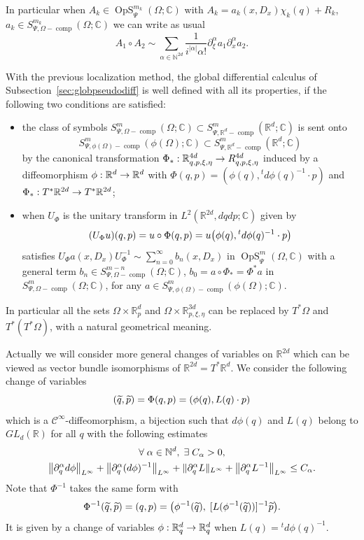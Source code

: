 \documentclass[AHL,Unicode,longabstracts]{cedram}
\newcommand{\C}{\mathbb{C}}
\newcommand{\R}{\mathbb{R}}
\newcommand{\N}{\mathbb{N}}
\newcommand{\clC}{\mathcal{C}}
\DeclareMathOperator{\OpS}{OpS}
\DeclareMathOperator{\ccomp}{comp}
\let\oldtilde\tilde
\renewcommand*{\tilde}[1]{\mathchoice{\widetilde{#1}}{\widetilde{#1}}{\oldtilde{#1}}{\oldtilde{#1}}}
\let\oldexists\exists
\renewcommand*{\exists}{\mathrel{\oldexists}}
\let\oldforall\forall
\renewcommand*{\forall}{\mathrel{\oldforall}}
\let\originalleft\left
\let\originalright\right
\renewcommand{\left}{\mathopen{}\mathclose\bgroup\originalleft}
\renewcommand{\right}{\aftergroup\egroup\originalright}
\renewcommand*{\to}{\mathchoice{\longrightarrow}{\rightarrow}{\rightarrow}{\rightarrow}}
\begin{document}
In particular when $A_{k}\in \OpS^{m_{k}}_{\Psi}(\Omega;\C)$ with $A_{k}=a_{k}(x,D_{x})\chi_{k}(q)+R_{k}$, $a_{k}\in S^{m_{k}}_{\Psi,\Omega-\ccomp}(\Omega;\C)$ we can write as usual
\[
A_{1}\circ A_{2}\sim \sum_{\alpha \in \N^{2d}}\frac{1}{i^{|\alpha|}\alpha!}\partial_{\xi}^{\alpha}a_{1}\partial_{x}^{\alpha}a_{2}.
\]

With the previous localization method, the global differential calculus of Subsection~\ref{sec:globpseudodiff} is well defined with all its properties, if the following two conditions are satisfied:
\begin{itemize}
\item the class of symbols $S^{m}_{\Psi,\Omega-\ccomp}(\Omega;\C)\subset S^{m}_{\Psi,\R^{d}-\ccomp}(\R^{d};\C)$ is sent onto 
\[
S^{m}_{\Psi,\phi(\Omega)-\ccomp}(\phi(\Omega);\C) \subset S^m_{\Psi,\R^d-\ccomp}(\R^d;\C)
\]
by the canonical transformation $\Phi_{*}: \R^{4d}_{q,p,\xi,\eta}\to R^{4d}_{q,p,\xi,\eta}$ induced by a diffeomorphism $\phi:\R^{d}\to \R^{d}$ with $\Phi(q,p)=(\phi(q),{}^{t}d\phi(q)^{-1}\cdot p)$ and $\Phi_{*}:T^{*}\R^{2d}\to T^{*}\R^{2d}$;
\item when $U_{\Phi}$ is the unitary transform in $L^{2}(\R^{2d},dqdp;\C)$ given by
\[
(U_{\Phi}u)(q,p)=u\circ{\Phi(q,p)}=u\left(\phi(q),{}^{t}d\phi(q)^{-1}\cdot p\right)
\]
satisfies $U_{\Phi}a(x,D_{x})U_{\Phi}^{-1}\sim \sum_{n=0}^{\infty}b_{n}(x,D_{x})$ in $\OpS^{m}_{\Psi}(\Omega,\C)$ with a general term $b_{n}\in S^{m-n}_{\Psi, \Omega-\ccomp}(\Omega;\C)$, $b_{0}=a\circ \Phi_{*}=\Phi^{*}a$ in $S^{m}_{\Psi,\Omega-\ccomp}(\Omega;\C)$, for any $a\in S^{m}_{\Psi,\phi(\Omega)-\ccomp}(\phi(\Omega);\C)$.
\end{itemize}
In particular all the sets $\Omega\times\R^{d}_{p}$ and $\Omega\times \R^{3d}_{p,\xi,\eta}$ can be replaced by $T^{*}\Omega$ and $T^{*}(T^{*}\Omega)$, with a natural geometrical meaning.

Actually we will consider more general changes of variables on $\R^{2d}$ which can be viewed as vector bundle isomorphisms of $\R^{2d}=T^{*}\R^{d}$. We consider the following change of variables
\begin{equation}\label{eq:defPhi}
(\tilde{q},\tilde{p})=\Phi(q,p)=(\phi(q), L(q)\cdot p)
\end{equation}
which is a $\clC^{\infty}$-diffeomorphism, a bijection such that $d\phi(q)$ and $L(q)$ belong to $GL_{d}(\R)$ for all $q$ with the following estimates
\begin{equation}\label{eq:estimPhi}
\begin{gathered}
\forall \alpha\in \N^{d},\;\exists C_{\alpha}>0,\\
\left\|\partial_{q}^{\alpha}d\phi\right\|_{L^{\infty}}+\left\|\partial_{q}^{\alpha}(d\phi)^{-1}\right\|_{L^{\infty}}+\|\partial_{q}^{\alpha}L\|_{L^{\infty}}+\left\|\partial_{q}^{\alpha}L^{-1}\right\|_{L^{\infty}}\leq C_{\alpha}.
\end{gathered}
\end{equation}
Note that $\Phi^{-1}$ takes the same form with
\[
\Phi^{-1}(\tilde{q},\tilde{p})=(q,p)=\left(\phi^{-1}(\tilde{q}),\;[L(\phi^{-1}(\tilde{q}))]^{-1}\tilde{p}\right).
\]
It is given by a change of variables $\phi:\R^{d}_{q}\to \R^{d}_{q}$ when $L(q)={}^{t}d\phi(q)^{-1}$.
\end{document}

